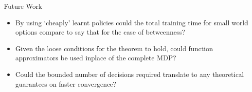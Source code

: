 \vfill
\begin{block}{Future Work}
    \begin{itemize}
        \item By using `cheaply' learnt policies could the total training time
            for small world options compare to say that for the case of
            betweenness?
        \item Given the loose conditions for the theorem to hold, could function
            approximators be used inplace of the complete MDP?
        \item Could the bounded number of decisions required translate to any
            theoretical guarantees on faster convergence?
    \end{itemize}
\end{block}
